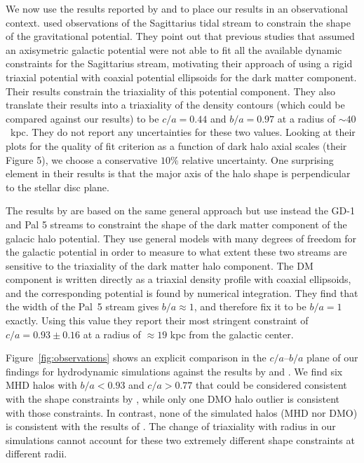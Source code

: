 \documentclass[usenatbib]{mnras}
\begin{document}
We now use the results reported by \cite{LM10} and \cite{Bovy16}
to place our results in an observational context.
\cite{LM10} used observations of the Sagittarius tidal stream to
constrain the shape of the gravitational potential.
They point out that previous studies that assumed an
axisymetric galactic potential were not able to fit all the available
dynamic constraints for the Sagittarius stream, motivating 
their approach of using a rigid triaxial potential with coaxial potential
ellipsoids for the dark matter component.  
Their results constrain the triaxiality of this potential
component.  They also translate their results into a triaxiality of the density
contours (which could be compared against our results)
 to be $c/a=0.44$ and $b/a=0.97$ at a radius of $\sim 40$~kpc. 
They do not report any uncertainties for these two values. 
Looking at their plots for the quality of fit criterion as a function
of dark halo axial scales (their Figure 5), we choose a conservative $10\%$
relative uncertainty. One surprising element in their results is that 
the major axis of the
halo shape is perpendicular to the stellar disc plane.  

The results by \cite{Bovy16} are based on the same general approach but use
instead the GD-1 \citep{2006ApJ...641L..37G} and Pal 5 \citep{2009AJ....137.3378O}
streams to constraint the shape of the dark matter component of the
galacic halo potential. They use general models with many degrees of freedom for the galactic
potential in order to measure to what extent these two streams are sensitive
to the triaxiality of the dark matter halo component.
The DM component is written directly as a triaxial density profile
with coaxial ellipsoids, and the corresponding potential is found by
numerical integration. They find that the width of the Pal~5 stream gives $b/a\approx
1$, and therefore fix it to be $b/a=1$ exactly. Using this value they report their 
most stringent constraint of $c/a=0.93\pm0.16$ at a radius of $\approx 19$ kpc from the galactic
center. 

Figure~\ref{fig:observations} shows an explicit comparison in
the $c/a$--$b/a$ plane of our findings for hydrodynamic simulations against the
results by \cite{LM10} and \cite{Bovy16}.
We find six MHD halos with $b/a<0.93$ and $c/a>0.77$ that could be
considered consistent with the shape constraints  by \citet{Bovy16}, while
only one DMO halo outlier  is consistent with those constraints.
In contrast, none of the simulated halos (MHD nor DMO) is consistent
with the results of \citet{LM10}. The change of triaxiality with radius in 
our simulations cannot account for these two extremely different 
shape constraints at different radii. 
\end{document}
